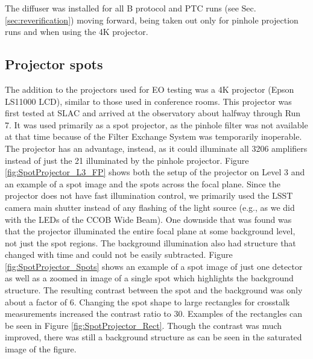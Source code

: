 The diffuser was installed for all B protocol and PTC runs (see Sec. \ref{sec:reverification}) moving forward, being taken out only for pinhole projection runs and when using the 4K projector.

\subsection{Projector spots}\label{projector-spots}
The addition to the projectors used for EO testing was a 4K projector (Epson LS11000 LCD), similar to those used in conference rooms. This projector was first tested at SLAC and arrived at the observatory about halfway through Run 7. It was used primarily as a spot projector, as the pinhole filter was not available at that time because of the Filter Exchange System was temporarily inoperable. The projector has an advantage, instead, as it could illuminate all 3206 amplifiers instead of just the 21 illuminated by the
pinhole projector. Figure \ref{fig:SpotProjector_L3_FP} shows both the setup of the projector on Level 3 and an example of a spot image and the spots across the focal plane. Since the projector does not have fast illumination control, we primarily used the LSST camera main shutter instead of any flashing of the light source (e.g., as we did with the LEDs of the CCOB Wide Beam). One downside that was found was that the projector illuminated the entire focal plane at some background level, not just the spot regions. The background illumination also had structure that changed with time and could not be easily subtracted. Figure \ref{fig:SpotProjector_Spots} shows an example of a spot image of just one detector as well as a zoomed in image of a single spot which highlights the background structure. The resulting contrast between the spot and the background was only about a factor of 6. Changing the spot shape to large rectangles for crosstalk
measurements increased the contrast ratio to 30. Examples of the rectangles can be seen in Figure \ref{fig:SpotProjector_Rect}. Though the contrast was much improved, there was still a background structure as can be seen in the saturated image of the figure.


